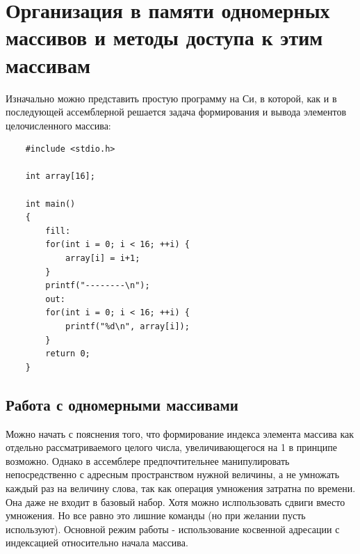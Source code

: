 \section{Организация в памяти одномерных массивов и методы доступа к этим массивам}

Изначально можно представить простую программу на Си, в которой, как и в последующей ассемблерной решается задача формирования и вывода элементов целочисленного массива:

\begin{verbatim}
    #include <stdio.h>

    int array[16];

    int main()
    {
        fill:
        for(int i = 0; i < 16; ++i) {
            array[i] = i+1;
        }
        printf("--------\n");
        out:
        for(int i = 0; i < 16; ++i) {
            printf("%d\n", array[i]);
        }
        return 0;
    }
\end{verbatim}

\subsection{Работа с одномерными массивами}
Можно начать с пояснения того, что формирование индекса элемента массива как отдельно рассматриваемого целого числа, увеличивающегося на 1 в принципе возможно. Однако в ассемблере предпочтительнее манипулировать непосредственно с адресным пространством нужной величины, а не умножать каждый раз на величину слова, так как операция умножения затратна по времени. Она даже не входит в базовый набор. Хотя можно ислпользовать сдвиги вместо умножения. Но все равно это лишние команды (но при желании пусть используют).
Основной режим работы - использование косвенной адресации с индексацией относительно начала массива.

